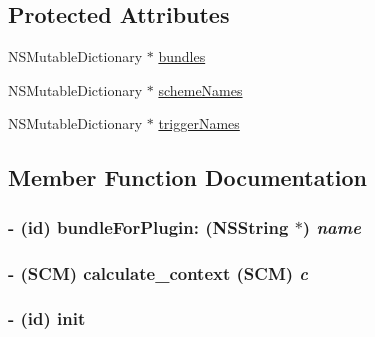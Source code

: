 \subsection*{Protected Attributes}
\begin{CompactItemize}
\item 
NSMutableDictionary $\ast$ \hyperlink{interface_c_m_trigger_controller_5f63a268b74e47fcdfde3ea1154a9694}{bundles}
\item 
NSMutableDictionary $\ast$ \hyperlink{interface_c_m_trigger_controller_3495c16ffa6b74cbc757085af6370051}{schemeNames}
\item 
NSMutableDictionary $\ast$ \hyperlink{interface_c_m_trigger_controller_0d952c6951663ffd7157ec4644219fad}{triggerNames}
\end{CompactItemize}


\subsection{Member Function Documentation}
\hypertarget{interface_c_m_trigger_controller_9e301be537e86bba778a0652bf38134d}{
\subsubsection[bundleForPlugin:]{\setlength{\rightskip}{0pt plus 5cm}- (id) bundleForPlugin: ({\bf NSString} $\ast$) {\em name}}}
\label{interface_c_m_trigger_controller_9e301be537e86bba778a0652bf38134d}


\hypertarget{interface_c_m_trigger_controller_d87aa3e94baf65a3ca6f685f91a22929}{
\subsubsection[calculate\_\-context]{\setlength{\rightskip}{0pt plus 5cm}- (SCM) calculate\_\-context (SCM) {\em c}}}
\label{interface_c_m_trigger_controller_d87aa3e94baf65a3ca6f685f91a22929}


\hypertarget{interface_c_m_trigger_controller_c6f39b489d64555699fa9c38e0516581}{
\subsubsection[init]{\setlength{\rightskip}{0pt plus 5cm}- (id) init }}
\label{interface_c_m_trigger_controller_c6f39b489d64555699fa9c38e0516581}


